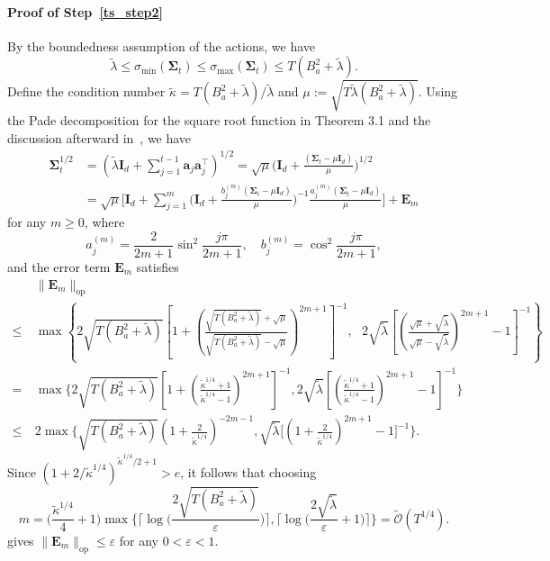 \documentclass[10pt]{article}
\newcommand{\id}{\bI}
\newcommand{\eps}{\varepsilon}
\newcommand{\lops}[1]{\|{#1}\|_{\mathrm{op}}}
\newcommand{\<}{\left\langle}
\renewcommand{\>}{\right\rangle}
\newcommand{\Tpscov}{{{\mathbf\Sigma}}}
\newcommand{\prodeig}{{\mu}}
\newcommand{\Errmat}{{\mathbf {E}}}
\newcommand{\padecond}{{\tilde \kappa}}
\newcommand{\tcO}{{\tilde{\mathcal O}}}
\def\bI{{\mathbf I}}
\def\ba{{\mathbf a}}
\begin{document}
\paragraph{Proof of Step~\ref{ts_step2}}
By the boundedness assumption of the actions, we have $$\tilde\lambda\leq\sigma_{\min}(\Tpscov_t)\leq\sigma_{\max}(\Tpscov_t)\leq T(B_a^2+\tilde\lambda).$$ 
Define the condition number $\padecond=T(B_a^2+\tilde\lambda)/\tilde\lambda$ and $\prodeig:=\sqrt{T\tilde\lambda(B_a^2+\tilde\lambda)}$. 
Using the Pade decomposition for the  square root function in Theorem 3.1 and the discussion afterward in~\cite{lu1998pade}, we have
\begin{align*} 
\Tpscov^{1/2}_t&=(\tilde\lambda\id_d+\sum_{j=1}^{t-1}\ba_j\ba_j^\top)^{1/2}=\sqrt{\prodeig}\Big(\id_d+\frac{(\Tpscov_t-\prodeig \id_d)}{\prodeig}\Big)^{1/2}\\
&=
\sqrt{\prodeig}\Big[\id_d+\sum_{j=1}^m \Big(\id_d+\frac{b_j^{(m)}(\Tpscov_t-\prodeig \id_d)}{\prodeig}\Big)^{-1}\frac{a_j^{(m)}(\Tpscov_t-\prodeig \id_d)}{\prodeig}\Big]+\Errmat_{m}
\end{align*}
for any $m\geq0$, 
where 
$$
a_j^{(m)}=\frac{2}{2 m+1} \sin ^2 \frac{j \pi}{2 m+1}, \quad b_j^{(m)}=\cos ^2 \frac{j \pi}{2 m+1},
$$ and the error term $\Errmat_m$ satisfies \begin{align*}
&~\lops{\Errmat_m}\\
\leq&~
\max \left\{2 \sqrt{{T(B_a^2+\tilde\lambda)}}\left[1+\left(\frac{\sqrt{T(B_a^2+\tilde\lambda)}+\sqrt{\mu}}{\sqrt{T(B_a^2+\tilde\lambda)}-\sqrt{\mu}}\right)^{2 m+1}\right]^{-1},~~~2 \sqrt{{\tilde\lambda}}\left[\left(\frac{\sqrt{\mu}+\sqrt{\tilde\lambda}}{\sqrt{\mu}-\sqrt{\tilde\lambda}}\right)^{2 m+1}-1\right]^{-1}\right\}
\\
=&~\max\Big\{2\sqrt{{T(B_a^2+\tilde\lambda)}}[1+(\frac{\padecond^{1/4}+1}{\padecond^{1/4}-1})^{2m+1}]^{-1},2\sqrt{\tilde\lambda}[(\frac{\padecond^{1/4}+1}{\padecond^{1/4}-1})^{2m+1}-1]^{-1}\Big\}\\
\leq&~2\max\Big\{\sqrt{{T(B_a^2+\tilde\lambda)}}(1+\frac{2}{\padecond^{1/4}})^{-2m-1},\sqrt{\tilde\lambda}\Big[(1+\frac{2}{\padecond^{1/4}})^{2m+1}- 1\Big]^{-1}\Big\}.
\end{align*}
Since $(1+2/\padecond^{1/4})^{\padecond^{1/4}/2+1}>e$, it follows that choosing $$
m= \Big(\frac{\padecond^{1/4}}{4}+1\Big)\max\Big\{\Big\lceil\log\Big(\frac{2\sqrt{T(B_a^2+\tilde\lambda)}}{\eps}\Big)\Big\rceil,\Big\lceil\log\Big(\frac{2\sqrt{\tilde\lambda}}{\eps}+1\Big)\Big\rceil\Big\}=\tcO(T^{1/4}).
$$ gives $\lops{\Errmat_m}\leq\eps$ for any $0<\eps<1$.
\end{document}
